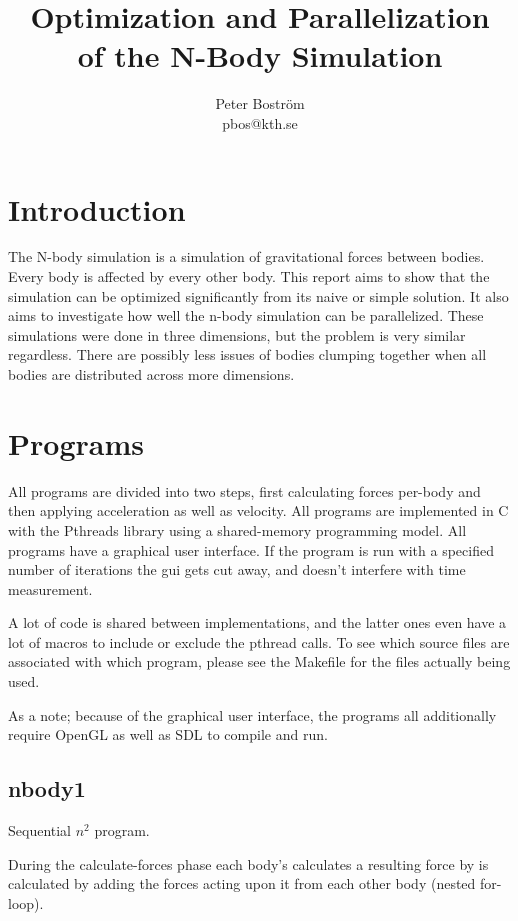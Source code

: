 \documentclass[a4paper] {article}
\title {Optimization and Parallelization \\ of the N-Body Simulation}
\author {Peter Boström \\ pbos@kth.se}
\begin{document}
\maketitle

\tableofcontents
\clearpage

\section{Introduction}

The N-body simulation is a simulation of gravitational forces between bodies. Every body is affected by every other body. This report aims to show that the simulation can be optimized significantly from its naive or simple solution. It also aims to investigate how well the n-body simulation can be parallelized. These simulations were done in three dimensions, but the problem is very similar regardless. There are possibly less issues of bodies clumping together when all bodies are distributed across more dimensions.

\section{Programs}

All programs are divided into two steps, first calculating forces per-body and then applying acceleration as well as velocity. All programs are implemented in C with the Pthreads library using a shared-memory programming model. All programs have a graphical user interface. If the program is run with a specified number of iterations the gui gets cut away, and doesn't interfere with time measurement.

A lot of code is shared between implementations, and the latter ones even have a lot of macros to include or exclude the pthread calls. To see which source files are associated with which program, please see the Makefile for the files actually being used.

As a note; because of the graphical user interface, the programs all additionally require OpenGL as well as SDL to compile and run.

\subsection{nbody1}

Sequential $n^2$ program.

During the calculate-forces phase each body's calculates a resulting force by is calculated by adding the forces acting upon it from each other body (nested for-loop).
\end{document}
